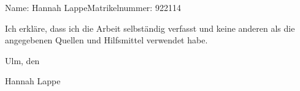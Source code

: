 \documentclass[a4paper,
fontsize=12pt,
headsepline,           %
oneside,               %
number=noenddot,       %
bibliography=totoc,    %
BCOR=15mm              %
]{scrbook}
\newcommand{\fullname}{Hannah Lappe}
\newcommand{\matnr}{922114}
\begin{document}

\tableofcontents

\mainmatter







\appendix


\backmatter

\printbibliography

\clearpage
\thispagestyle{empty}

Name: \fullname \hfill Matrikelnummer: \matnr \vspace{2cm}


Ich erkläre, dass ich die Arbeit selbständig verfasst und keine anderen als die angegebenen Quellen und Hilfsmittel verwendet habe.\vspace{2cm}

Ulm, den \dotfill

\hspace{10cm} {\footnotesize \fullname}
\end{document}
